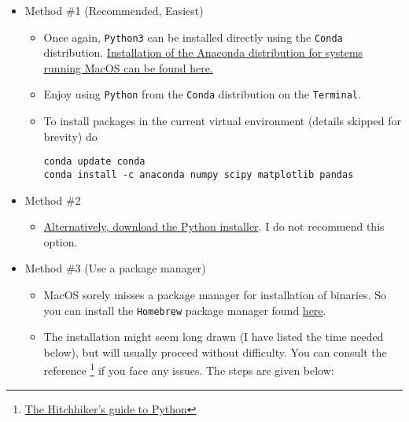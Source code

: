 \documentclass[11pt]{article}
\begin{document}
\begin{itemize}
\item Method \#1 (Recommended, Easiest)
\label{sec:org19909df}
\begin{itemize}
\item Once again, \texttt{Python3} can be installed directly using the \texttt{Conda} distribution. \href{https://www.anaconda.com/download/\#macos}{Installation of the Anaconda distribution for systems running MacOS can be found here.}
\item Enjoy using \texttt{Python} from the \texttt{Conda} distribution on the \texttt{Terminal}.
\item To install packages in the current virtual environment (details skipped for
brevity) do
\begin{verbatim}
conda update conda
conda install -c anaconda numpy scipy matplotlib pandas
\end{verbatim}
\end{itemize}

\item Method \#2
\label{sec:org4a5a52d}
\begin{itemize}
\item \href{https://www.python.org/downloads/mac-osx/}{Alternatively, download the Python installer}. I do not recommend this
option.
\end{itemize}

\item Method \#3 (Use a package manager)
\label{sec:org155ca14}
\begin{itemize}
\item MacOS sorely misses a package manager for installation of binaries. So you
can install the \texttt{Homebrew} package manager found \href{https://brew.sh/}{here}.
\item The installation might seem long drawn (I have listed the time needed
below), but will usually proceed without difficulty. You can consult the
reference \footnote{\href{https://docs.python-guide.org/starting/install3/osx/}{The Hitchhiker's guide to Python}} if you face any issues. The steps are given below:


\end{itemize}
\end{itemize}
\end{document}
